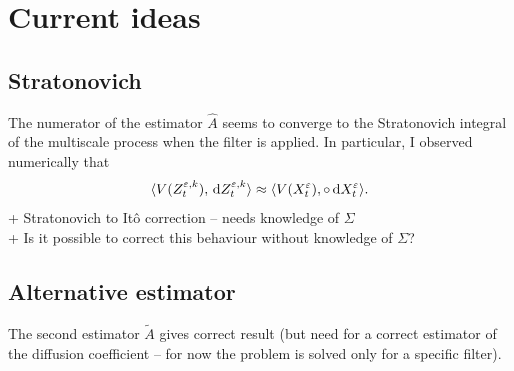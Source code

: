 \documentclass[10pt]{article}
\begin{document}
\section{Current ideas}

\subsection{Stratonovich}
The numerator of the estimator $\hat A$ seems to converge to the Stratonovich integral of the multiscale process when the filter is applied. In particular, I observed numerically that
\begin{equation}
	\langle V(Z_t^{\varepsilon,k}), \,\mathrm{d} Z_t^{\varepsilon,k} \rangle \approx \langle V(X_t^\varepsilon), \circ \,\mathrm{d} X_t^\varepsilon\rangle.
\end{equation}
+ Stratonovich to Itô correction -- needs knowledge of $\Sigma$ \\
+ Is it possible to correct this behaviour without knowledge of $\Sigma$?

\subsection{Alternative estimator}
The second estimator $\widetilde A$ gives correct result (but need for a correct estimator of the diffusion coefficient -- for now the problem is solved only for a specific filter).
\end{document}
